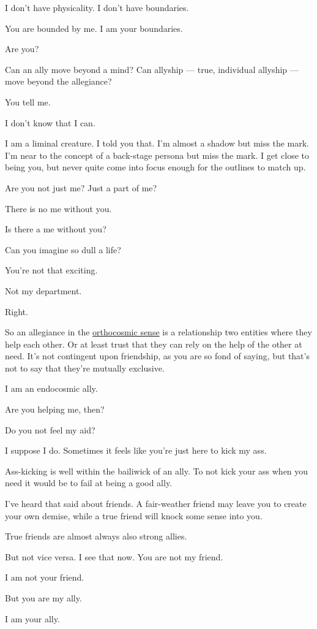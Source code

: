 \begin{ally}
I don't have physicality. I don't have boundaries.
\end{ally}
You are bounded by me. I am your boundaries.

\begin{ally}
Are you?
\end{ally}
Can an ally move beyond a mind? Can allyship --- true, individual allyship --- move beyond the allegiance?

\begin{ally}
You tell me.
\end{ally}
I don't know that I can.

\begin{ally}
I am a liminal creature. I told you that. I'm almost a shadow but miss the mark. I'm near to the concept of a back-stage persona but miss the mark. I get close to being you, but never quite come into focus enough for the outlines to match up.
\end{ally}
Are you not just me? Just a part of me?

\begin{ally}
There is no me without you.
\end{ally}
Is there a me without you?

\begin{ally}
Can you imagine so dull a life?
\end{ally}
You're not that exciting.

\begin{ally}
Not my department.
\end{ally}
Right.

So an allegiance in the \href{http://wiki.postfurry.net/wiki/Metacosmology}{orthocosmic sense} is a relationship two entities where they help each other. Or at least trust that they can rely on the help of the other at need. It's not contingent upon friendship, as you are so fond of saying, but that's not to say that they're mutually exclusive.

\begin{ally}
I am an endocosmic ally.
\end{ally}
Are you helping me, then?

\begin{ally}
Do you not feel my aid?
\end{ally}
I suppose I do. Sometimes it feels like you're just here to kick my ass.

\begin{ally}
Ass-kicking is well within the bailiwick of an ally. To not kick your ass when you need it would be to fail at being a good ally.
\end{ally}
I've heard that said about friends. A fair-weather friend may leave you to create your own demise, while a true friend will knock some sense into you.

\begin{ally}
True friends are almost always also strong allies.
\end{ally}
But not vice versa. I see that now. You are not my friend.

\begin{ally}
I am not your friend.
\end{ally}
But you are my ally.

\begin{ally}
I am your ally.
\end{ally}
\newpage
